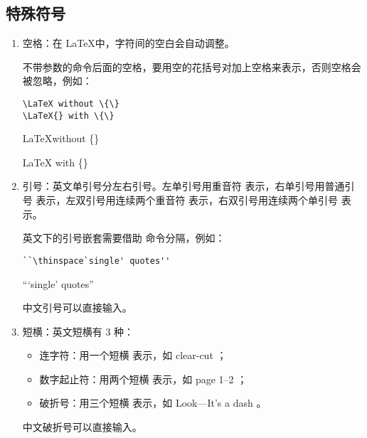 \subsection{特殊符号}
\begin{enumerate}

\item 空格：在 \LaTeX 中，字符间的空白会自动调整。

不带参数的命令后面的空格，要用空的花括号对加上空格来表示，否则空格会被忽略，例如：

\begin{tcolorbox}[sidebyside]
\begin{lstlisting}
\LaTeX without \{\}
\LaTeX{} with \{\}
\end{lstlisting} 

\tcblower

\LaTeX without \{\}

\LaTeX{} with \{\}
\end{tcolorbox}

\item 引号：英文单引号分左右引号。左单引号用重音符  表示，右单引号用普通引号  表示，左双引号用连续两个重音符  表示，右双引号用连续两个单引号  表示。

英文下的引号嵌套需要借助 \boxforcmd{\\thinspace} 命令分隔，例如：

\begin{tcolorbox}[sidebyside]
\begin{lstlisting}
``\thinspace`single' quotes''
\end{lstlisting}

\tcblower

``\thinspace`single' quotes''
\end{tcolorbox}

中文引号可以直接输入。

\item 短横：英文短横有 3 种：

\begin{itemize}
    \item 连字符：用一个短横 \boxforcmd{-} 表示，如 clear-cut ； 
    \item 数字起止符：用两个短横 \boxforcmd{--} 表示，如 page 1--2 ；
    \item 破折号：用三个短横 \boxforcmd{---} 表示，如 Look---It's a dash 。
\end{itemize}

中文破折号可以直接输入。


\end{enumerate}
